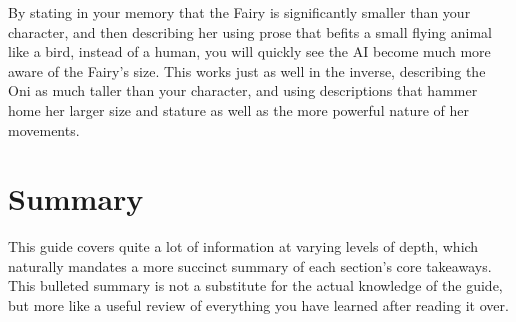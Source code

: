 ﻿\documentclass[Coomer-main.tex]{subfiles}
\begin{document}
By stating in your memory that the Fairy is significantly smaller than your character, and then describing her using prose that befits a small flying animal like a bird, instead of a human, you will quickly see the AI become much more aware of the Fairy’s size. This works just as well in the inverse, describing the Oni as much taller than your character, and using descriptions that hammer home her larger size and stature as well as the more powerful nature of her movements.

\chapter{Summary}

This guide covers quite a lot of information at varying levels of depth, which naturally mandates a more succinct summary of each section's core takeaways. This bulleted summary is not a substitute for the actual knowledge of the guide, but more like a useful review of everything you have learned after reading it over.
\end{document}
